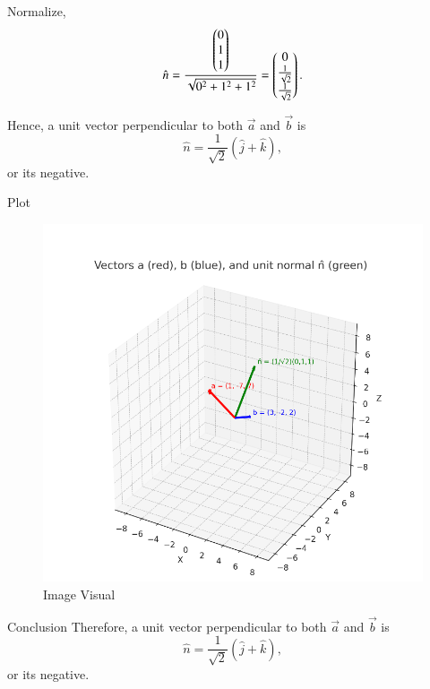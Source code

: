 \documentclass{beamer}
\begin{document}
\begin{frame}
Normalize,
\begin{equation}
\hat{n} = \frac{\begin{pmatrix}0 \\ 1 \\ 1\end{pmatrix}}{\sqrt{0^2 + 1^2 + 1^2}}
= \begin{pmatrix}0 \\ \tfrac{1}{\sqrt{2}} \\ \tfrac{1}{\sqrt{2}}\end{pmatrix}.
\end{equation}

Hence, a unit vector perpendicular to both $\vec{a}$ and $\vec{b}$ is
\begin{equation}
\hat{n} = \frac{1}{\sqrt{2}}(\hat{j} + \hat{k}),
\end{equation}
or its negative.
\end{frame}
\begin{frame}{Plot}
    \begin{figure}[H]
    \centering
    \includegraphics[width=0.75\columnwidth]{figs/image.png}
    \caption{Image Visual}
    \label{fig:figs/image.png}
    \end{figure}
\end{frame}

\begin{frame}{Conclusion}
    Therefore, a unit vector perpendicular to both $\vec{a}$ and $\vec{b}$ is
\[
\hat{n} = \frac{1}{\sqrt{2}}(\hat{j} + \hat{k}),
\]
or its negative.
\end{frame}
\end{document}
